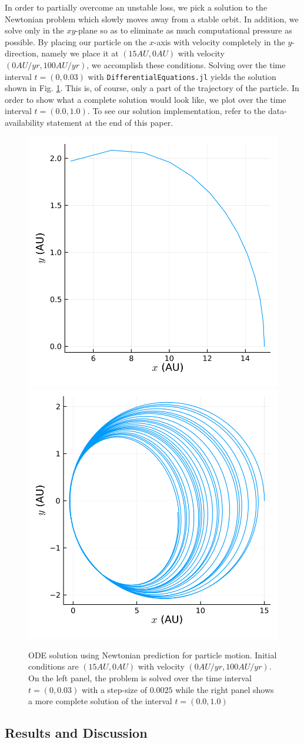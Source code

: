 \documentclass{CUP-JNL-DTM}%
\theoremstyle{definition}
\numberwithin{equation}{section}
\begin{document}
In order to partially overcome an unstable loss, we pick a solution to the Newtonian problem which slowly moves away from a stable orbit. In addition, we solve only in the $xy$-plane so as to eliminate as much computational pressure as possible. By placing our particle on the $x$-axis with velocity completely in the $y$-direction, namely we place it at $(15 \si{AU}, 0 \si{AU})$ with velocity $(0 \si{AU/yr}, 100 \si{AU/yr})$, we accomplish these conditions. Solving over the time interval $t = (0, 0.03)$ with \texttt{DifferentialEquations.jl} yields the solution shown in Fig. \ref{fig:newton_sol}. This is, of course, only a part of the trajectory of the particle. In order to show what a complete solution would look like, we plot over the time interval $t = (0.0, 1.0)$. To see our solution implementation, refer to the data-availability statement at the end of this paper. 

\begin{figure}
    \centering
    \includegraphics[width=0.3\linewidth]{figures/newton_solution.png}
    \includegraphics[width=0.3\linewidth]{figures/newton_solution_complete.png}
    \caption{ODE solution using Newtonian prediction for particle motion. Initial conditions are $(15 \si{AU}, 0 \si{AU})$ with velocity $(0 \si{AU/yr}, 100 \si{AU/yr})$. On the left panel, the problem is solved over the time interval $t = (0, 0.03)$ with a step-size of $0.0025$ while the right panel shows a more complete solution of the interval $t = (0.0, 1.0)$}
    \label{fig:newton_sol}
\end{figure}

\subsection{Results and Discussion}
\end{document}
